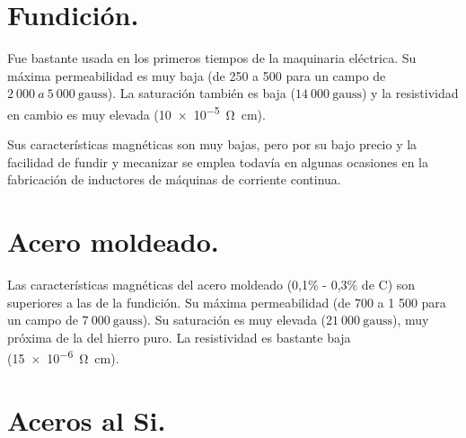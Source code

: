 \documentclass[12pt,a4paper]{article}
\begin{document}

\section{Fundición.}

Fue bastante usada en los primeros tiempos de la maquinaria eléctrica. Su máxima permeabilidad es muy baja (de 250 a 500 para un campo de $2\ 000\ a\ 5\ 000\ \mathrm{gauss}$). La saturación también es baja ($14\ 000\ \mathrm{gauss}$) y la resistividad en cambio es muy elevada (\SI{10e-5}{\ohm\centi\metre}). 

Sus características magnéticas son muy bajas, pero por su bajo precio y la facilidad de fundir y mecanizar se emplea todavía en algunas ocasiones en la fabricación de inductores de máquinas de corriente continua.

\section{Acero moldeado.}

Las características magnéticas del acero moldeado (0,1\% - 0,3\% de C) son superiores a las de la fundición. Su máxima permeabilidad (de 700 a 1 500  para un campo de $7\ 000\ \mathrm{gauss}$). Su saturación es muy elevada ($21\ 000\ \mathrm{gauss}$), muy próxima de la del hierro puro. La resistividad es bastante baja (\SI{15e-6}{\ohm\centi\metre}).

\section{Aceros al Si.}
\end{document}
